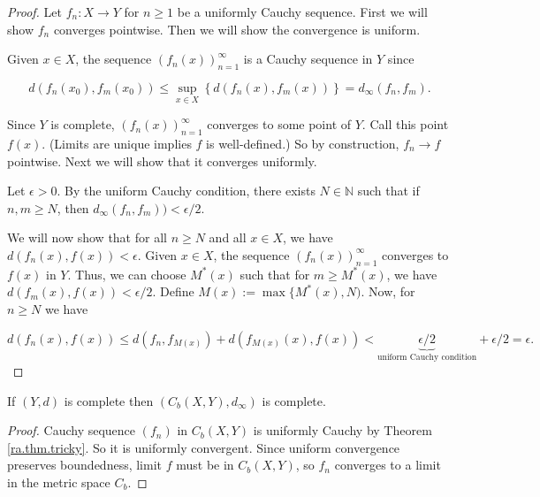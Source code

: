 \begin{proof}

Let \(f_n: X \to Y\) for \(n \geq 1\) be a uniformly Cauchy sequence. First we will show \(f_n\) converges pointwise. Then we will show the convergence is uniform. 

Given \(x \in X\), the sequence \((f_n(x))_{n=1}^\infty\) is a Cauchy sequence in \(Y\) since

\[
d(f_n(x_0), f_m(x_0)) \leq \sup_{x \in X} \left\{d(f_n(x), f_m(x)) \right\} = d_\infty(f_n, f_m).
\]

 Since \(Y\) is complete, \((f_n(x))_{n=1}^\infty\) converges to some point of \(Y\). Call this point \(f(x)\). (Limits are unique implies \(f\) is well-defined.) So by construction, \(f_n \to f\) pointwise. Next we will show that it converges uniformly.


Let \(\epsilon > 0\). By the uniform Cauchy condition, there exists \(N \in \mathbb{N}\) such that if \(n, m \geq N\), then  \(d_\infty(f_n, f_m)) < \epsilon/2\). 

We will now show that for all \(n \geq N\) and all \(x \in X\), we have \(d(f_n(x), f(x)) < \epsilon\). Given \(x \in X\), the sequence \((f_n(x))_{n=1}^\infty\) converges to \(f(x)\) in \(Y\). Thus, we can choose \( M^*(x)\) such that for \(m \geq M^*(x)\), we have \(d(f_m(x), f(x)) < \epsilon/2\). Define \(M(x) := \max\{M^*(x), N)\). Now, for \(n \geq N\) we have 

\[
d(f_n(x), f(x)) \leq d(f_n, f_{M(x)}) + d(f_{M(x)}(x), f(x)) < \underbrace{\epsilon/2}_{\text{uniform Cauchy condition}} + \epsilon /2 = \epsilon.
\]



\end{proof}

\begin{corollary}\label{ra.pugh.thm.4.3}

If \((Y, d)\) is complete then \((C_b(X, Y), d_\infty)\) is complete.

\end{corollary}

\begin{proof}

Cauchy sequence \((f_n)\) in \(C_b(X,Y)\) is uniformly Cauchy by Theorem \ref{ra.thm.tricky}. So it is uniformly convergent. Since uniform convergence preserves boundedness, limit \(f\) must be in \(C_b(X,Y)\), so \(f_n  \) converges to a limit in the metric space \(C_b\). 

\end{proof}

